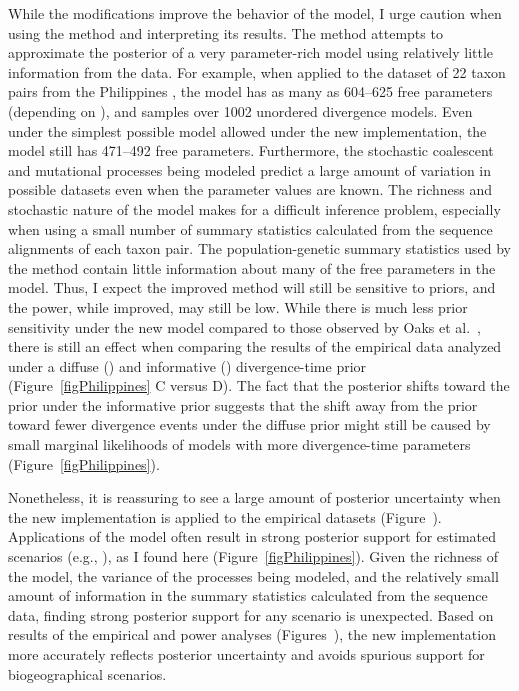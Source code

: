 While the modifications improve the behavior of the model, I urge caution when
using the method and interpreting its results.
The method attempts to approximate the posterior of a very parameter-rich model
using relatively little information from the data.
For example, when applied to the dataset of 22 taxon pairs from the Philippines
\cite{Oaks2012}, the model has as many as 604--625 free parameters
(depending on \divTimeNum), and samples over 1002 unordered divergence models.
Even under the simplest possible model allowed under the new implementation,
the model still has 471--492 free parameters.
Furthermore, the stochastic coalescent and mutational processes being modeled
predict a large amount of variation in possible datasets even when the
parameter values are known.
The richness and stochastic nature of the model makes for a difficult inference
problem, especially when using a small number of summary statistics calculated
from the sequence alignments of each taxon pair.
The population-genetic summary statistics used by the method contain little
information about many of the free parameters in the model.
Thus, I expect the improved method will still be sensitive to priors, and the
power, while improved, may still be low.
While there is much less prior sensitivity under the new model compared to
those observed by Oaks et al.\ \cite{Oaks2012}, there is still an effect when
comparing the results of the empirical data analyzed under a diffuse
(\empModelDPP) and informative (\empModelDPPInform) divergence-time prior
(Figure~\ref{figPhilippines} C versus D).
The fact that the posterior shifts toward the prior under the informative prior
suggests that the shift away from the prior toward fewer divergence events
under the diffuse prior might still be caused by small marginal likelihoods
of models with more divergence-time parameters (Figure~\ref{figPhilippines}).

Nonetheless, it is reassuring to see a large amount of posterior uncertainty
when the new implementation is applied to the empirical datasets
(Figure~).
Applications of the \msb model often result in strong posterior support for
estimated scenarios
(e.g.,
\cite{Barber2010,Carnaval2009,Chan2011,Hickerson2006,Leache2007,Plouviez2009,Stone2012,Voje2009,Oaks2012}),
as I found here (Figure~\ref{figPhilippines}).
Given the richness of the model, the variance of the processes being modeled,
and the relatively small amount of information in the summary statistics
calculated from the sequence data, finding strong posterior support for any
scenario is unexpected.
Based on results of the empirical and power analyses
(Figures~),
the new implementation more accurately reflects posterior uncertainty and
avoids spurious support for biogeographical scenarios.

